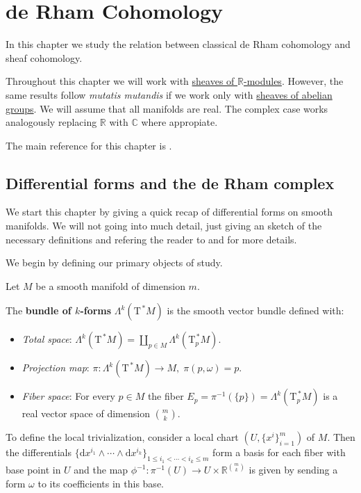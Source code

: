 \documentclass[../../main]{subfiles}
\begin{document}
\chapter{de Rham Cohomology}

In this chapter we study the relation between classical de Rham cohomology and sheaf cohomology.

Throughout this chapter we will work with \hyperref[def:sheaf]{sheaves of \(\mathbb{R}\)-modules}.
However, the same results follow \textit{mutatis mutandis} if we work only with \hyperref[def:sheaf]{sheaves of abelian groups}.
We will assume that all manifolds are real.
The complex case works analogously replacing \(\mathbb{R}\) with \(\mathbb{C}\) where appropiate.

The main reference for this chapter is \cite{voisinHodgeTheoryComplex}.

\section{Differential forms and the de Rham complex}
We start this chapter by giving a quick recap of differential forms on smooth manifolds.
We will not going into much detail, just giving an sketch of the necessary definitions and refering the reader to \cite[Chapter 4]{guilleminDifferentialTopology1974a} and \cite[Chapter 14]{leeIntroductionSmoothManifolds2012} for more details.

We begin by defining our primary objects of study.
\begin{definition}\label{def:smooth-k-form-bundle}
  Let \(M\) be a smooth manifold of dimension \(m\).

  The \textbf{bundle of \(k\)-forms} \(\Lambda^{k}(\mathrm{T}^{\,\ast}M)\) is the smooth vector bundle defined with:
  \begin{itemize}
    \item \textit{Total space}: \(\Lambda^{k}(\mathrm{T}^{\,\ast}M) = \coprod_{p \in M} \Lambda^{k}(\mathrm{T}_{p}^{\,\ast}M)\).
    \item \textit{Projection map}: \(\pi: \Lambda^{k}(\mathrm{T}^{\,\ast}M) \to M,\; \pi(p, \omega) = p\).
    \item \textit{Fiber space}: For every \(p \in M\) the fiber \(E_{p} = \pi^{-1}(\{p\}) = \Lambda^{k}(\mathrm{T}_{p}^{\,\ast}M)\) is a real vector space of dimension \(\binom{m}{k}\).
  \end{itemize}
  To define the local trivialization, consider a local chart \((U, \{x^{i}\}_{i=1}^{m})\) of \(M\).
  Then the differentials \(\{\mathrm{d}x^{i_{1}} \wedge \cdots \wedge \mathrm{d}x^{i_{k}}\}_{1 \leq i_{1} < \cdots < i_{k} \leq m}\) form a basis for each fiber with base point in \(U\) and the map \(\phi^{-1}: \pi^{-1}(U) \to U \times \mathbb{R}^{{m \choose k}}\) is given by sending a form \(\omega\) to its coefficients in this base.
\end{definition}
\end{document}
